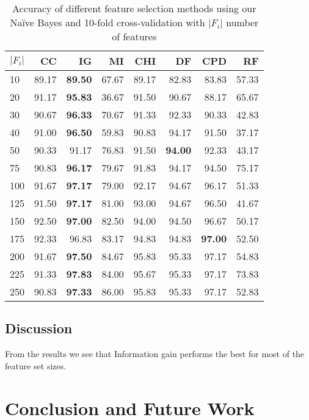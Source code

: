 \documentclass[10pt, a4paper]{article}
\begin{document}
\begin{table}[H]
\centering
\caption{Accuracy of different feature selection methods using our Na\"ive Bayes and 10-fold cross-validation with $|F_i|$ number of features}
\begin{tabular}{@{}l rrr rrrr@{}}
\toprule
$|F_i|$ & \textbf{CC} & \textbf{IG} & \textbf{MI} & \textbf{CHI} & \textbf{DF} & \textbf{CPD} & \textbf{RF} \\
\midrule
10 & 89.17 & \textbf{89.50} & 67.67 & 89.17 & 82.83 & 83.83 & 57.33 \\
20 & 91.17 & \textbf{95.83} & 36.67 & 91.50 & 90.67 & 88.17 & 65.67 \\
30 & 90.67 & \textbf{96.33} & 70.67 & 91.33 & 92.33 & 90.33 & 42.83 \\ 
40 & 91.00 & \textbf{96.50} & 59.83 & 90.83 & 94.17 & 91.50 & 37.17 \\
50 & 90.33 & 91.17 & 76.83 & 91.50 & \textbf{94.00} & 92.33 & 43.17 \\ 
75 & 90.83 & \textbf{96.17} & 79.67 & 91.83 & 94.17 & 94.50 & 75.17 \\ 
100 & 91.67 & \textbf{97.17} & 79.00 & 92.17 & 94.67 & 96.17 & 51.33 \\
125 & 91.50 & \textbf{97.17} & 81.00 & 93.00 & 94.67 & 96.50 & 41.67 \\
150 & 92.50 & \textbf{97.00} & 82.50 & 94.00 & 94.50 & 96.67 & 50.17 \\
175 & 92.33 & 96.83 & 83.17 & 94.83 & 94.83 & \textbf{97.00} & 52.50 \\
200 & 91.67 & \textbf{97.50} & 84.67 & 95.83 & 95.33 & 97.17 & 54.83 \\
225 & 91.33 & \textbf{97.83} & 84.00 & 95.67 & 95.33 & 97.17 & 73.83 \\
250 & 90.83 & \textbf{97.33} & 86.00 & 95.83 & 95.33 & 97.17 & 52.83 \\
\bottomrule
\end{tabular}
\label{table:diffbody}
\end{table}

\subsection{Discussion}
From the results we see that Information gain performs the best for most of the feature set sizes.

\section{Conclusion and Future Work}
\end{document}
